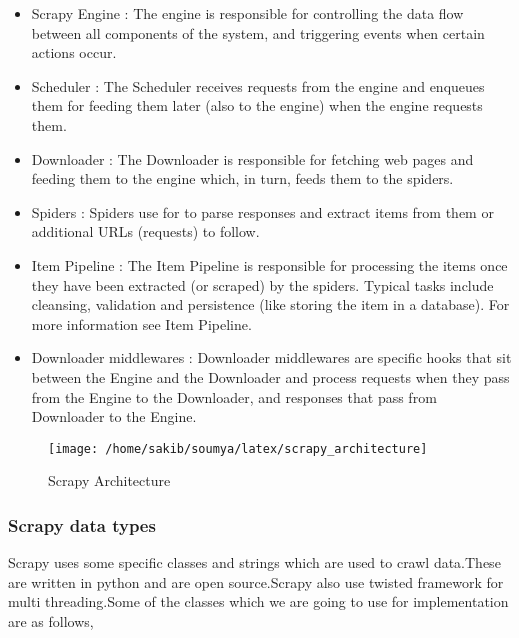 \begin{itemize}
\item Scrapy Engine :
The engine is responsible for controlling the data flow between all components of the system, and triggering events when certain actions occur. 

\item Scheduler :
The Scheduler receives requests from the engine and enqueues them for feeding them later (also to the engine) when the engine requests them.

\item Downloader :
The Downloader is responsible for fetching web pages and feeding them to the engine which, in turn, feeds them to the spiders.

\item Spiders :
Spiders use for to parse responses and extract items from them or additional URLs (requests) to follow.

\item Item Pipeline :
The Item Pipeline is responsible for processing the items once they have been extracted (or scraped) by the spiders. Typical tasks include cleansing, validation and persistence (like storing the item in a database). For more information see Item Pipeline.

\item Downloader middlewares :
Downloader middlewares are specific hooks that sit between the Engine and the Downloader and process requests when they pass from the Engine to the Downloader, and responses that pass from Downloader to the Engine.

\end{itemize}
\begin{figure}[h]
\texttt{[image: /home/sakib/soumya/latex/scrapy\_architecture]}
\centering
\caption{Scrapy Architecture}
\end{figure}

\subsubsection{Scrapy data types}
Scrapy uses some specific classes and strings which are used to crawl data.These are written in python and are open source.Scrapy also use twisted framework for multi threading.Some of the classes which we are going to use for implementation are as follows,

